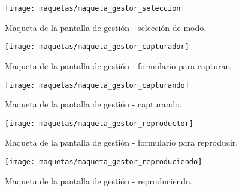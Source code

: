 \begin{figure}[!htp]
  \centering
  \texttt{[image: maquetas/maqueta\_gestor\_seleccion]}
  \caption{Maqueta de la pantalla de gestión - selección de modo.}
  \label{fig:maqueta:gestor_seleccion}
\end{figure}

\begin{figure}[!htp]
  \centering
  \texttt{[image: maquetas/maqueta\_gestor\_capturador]}
  \caption{Maqueta de la pantalla de gestión - formulario para capturar.}
  \label{fig:maqueta:gestor_capturador}
\end{figure}

\begin{figure}[!htp]
  \centering
  \texttt{[image: maquetas/maqueta\_gestor\_capturando]}
  \caption{Maqueta de la pantalla de gestión - capturando.}
  \label{fig:maqueta:gestor_capturando}
\end{figure}

\begin{figure}[!htp]
  \centering
  \texttt{[image: maquetas/maqueta\_gestor\_reproductor]}
  \caption{Maqueta de la pantalla de gestión - formulario para reproducir.}
  \label{fig:maqueta:gestor_reproductor}
\end{figure}

\begin{figure}[!htp]
  \centering
  \texttt{[image: maquetas/maqueta\_gestor\_reproduciendo]}
  \caption{Maqueta de la pantalla de gestión - reproduciendo.}
  \label{fig:maqueta:gestor_reproduciendo}
\end{figure}